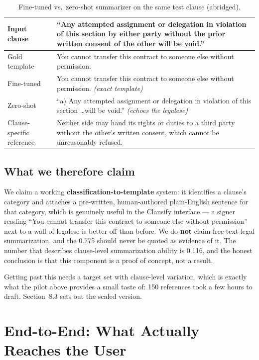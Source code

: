 \begin{table}[ht]
\centering
\caption{Fine-tuned vs.\ zero-shot summarizer on the same test clause (abridged).}
\label{tab:sumqual}
\small
\begin{tabular}{p{3.2cm} p{10.3cm}}
\toprule
\textbf{Input clause} & ``Any attempted assignment or delegation in violation of this section by either party without the prior written consent of the other will be void.''\\
\midrule
Gold template & You cannot transfer this contract to someone else without permission.\\
Fine-tuned    & You cannot transfer this contract to someone else without permission. \emph{(exact template)}\\
Zero-shot     & ``a) Any attempted assignment or delegation in violation of this section \ldots will be void.'' \emph{(echoes the legalese)}\\
\midrule
Clause-specific reference & Neither side may hand its rights or duties to a third party without the other's written consent, which cannot be unreasonably refused.\\
\bottomrule
\end{tabular}
\end{table}

\subsection{What we therefore claim}
We claim a working \textbf{classification-to-template} system: it identifies a clause's category and attaches a pre-written, human-authored plain-English sentence for that category, which is genuinely useful in the Clausify interface --- a signer reading ``You cannot transfer this contract to someone else without permission'' next to a wall of legalese is better off than before. We do \textbf{not} claim free-text legal summarization, and the 0.775 should never be quoted as evidence of it. The number that describes clause-level summarization ability is 0.116, and the honest conclusion is that this component is a proof of concept, not a result.

Getting past this needs a target set with clause-level variation, which is exactly what the pilot above provides a small taste of: 150 references took a few hours to draft. Section~8.3 sets out the scaled version.

\section{End-to-End: What Actually Reaches the User}
\label{sec:e2e}

